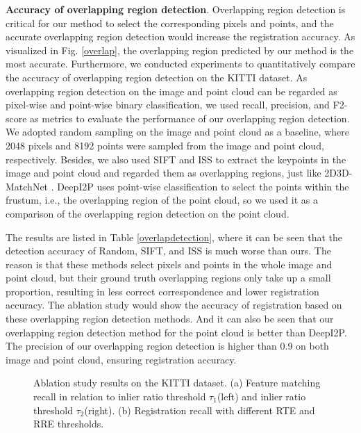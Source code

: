 \documentclass[lettersize,journal]{IEEEtran}
\begin{document}
\noindent\textbf{Accuracy of overlapping region detection}. Overlapping region detection is critical for our method to select the corresponding pixels and points, and the accurate overlapping region detection would increase the registration accuracy.
As visualized in Fig. \ref{overlap}, the overlapping region predicted by our method is the most accurate. Furthermore, we conducted experiments to quantitatively compare the accuracy of overlapping region detection on the KITTI dataset. As overlapping region detection on the image and point cloud can be regarded as pixel-wise and point-wise binary classification,
we used recall, precision, and F2-score as metrics to evaluate the performance of our overlapping region detection. We adopted random sampling on the image and point cloud as a baseline,
where 2048 pixels and 8192 points were sampled from the image and point cloud, respectively. Besides, we also used SIFT \cite{SIFT} and ISS \cite{ISS} to extract the keypoints in the image and point cloud and regarded them as overlapping regions, just like 2D3D-MatchNet \cite{2D3DMATCHNET}. DeepI2P uses  point-wise classification to select the points within the frustum, i.e., the overlapping region of the point cloud, so we used it as a comparison of the overlapping region detection on the point cloud.

The results are listed in Table \ref{overlapdetection}, where it can be seen that the detection accuracy of Random, SIFT, and ISS is much worse than ours. The reason is that these methods select pixels and points in the whole image and point cloud, but their ground truth overlapping regions only take up a small proportion, resulting in less correct correspondence and lower registration accuracy. The ablation study would show the accuracy of registration based on these overlapping region detection methods. And it can also be seen that our overlapping region detection method for the point cloud is better than DeepI2P. The precision of our overlapping region detection is higher than 0.9 on both image and point cloud, ensuring registration accuracy. \\

\begin{figure*}[h]
\centering
{}
\caption{Ablation study results on the KITTI dataset. (a) Feature matching recall in relation to inlier ratio threshold $\tau_1$(left) and inlier ratio threshold $\tau_2$(right). (b) Registration recall with different RTE and RRE thresholds.}
\label{FIG7}
\end{figure*}
\end{document}
